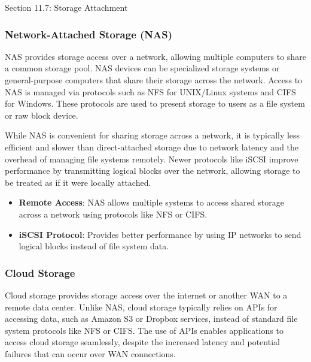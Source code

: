 \begin{notes}{Section 11.7: Storage Attachment}
\begin{highlight}
    \end{highlight}
    
    \subsubsection*{Network-Attached Storage (NAS)}
    
    NAS provides storage access over a network, allowing multiple computers to share a common storage pool. NAS devices can be specialized storage systems or general-purpose computers that share 
    their storage across the network. Access to NAS is managed via protocols such as NFS for UNIX/Linux systems and CIFS for Windows. These protocols are used to present storage to users as a file 
    system or raw block device.
    
    While NAS is convenient for sharing storage across a network, it is typically less efficient and slower than direct-attached storage due to network latency and the overhead of managing file systems 
    remotely. Newer protocols like iSCSI improve performance by transmitting logical blocks over the network, allowing storage to be treated as if it were locally attached.
    
    \begin{highlight}
    
        \begin{itemize}
            \item \textbf{Remote Access}: NAS allows multiple systems to access shared storage across a network using protocols like NFS or CIFS.
            \item \textbf{iSCSI Protocol}: Provides better performance by using IP networks to send logical blocks instead of file system data.
        \end{itemize}
    
    \end{highlight}
    
    \subsubsection*{Cloud Storage}
    
    Cloud storage provides storage access over the internet or another WAN to a remote data center. Unlike NAS, cloud storage typically relies on APIs for accessing data, such as Amazon S3 or Dropbox 
    services, instead of standard file system protocols like NFS or CIFS. The use of APIs enables applications to access cloud storage seamlessly, despite the increased latency and potential failures that 
    can occur over WAN connections.
    

\end{notes}
